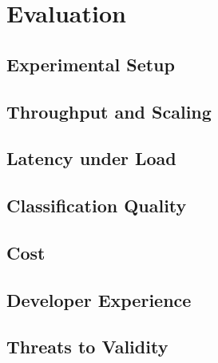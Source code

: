 \chapter{Evaluation}\label{ch:eval}

\section{Experimental Setup}
\section{Throughput and Scaling}
\section{Latency under Load}
\section{Classification Quality}
\section{Cost}
\section{Developer Experience}
\section{Threats to Validity}

